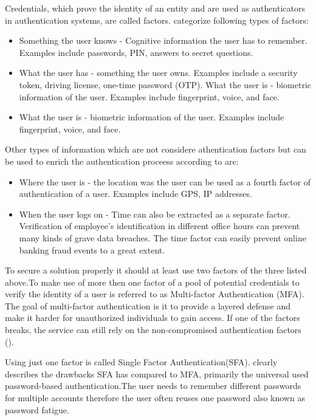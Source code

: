 Credentials, which prove the identity of an entity and are used as authenticators in authentication systems, are called factors. \citet{NIST:2017:DIG} categorize following types of factors:

\begin{itemize}  
\item Something the user knows - Cognitive information the user has to remember. Examples include passwords, PIN, answers to secret questions.
\item What the user has - something the user owns. Examples include a security token, driving license, one-time password (OTP). 
What the user is - biometric information of the user. Examples include fingerprint, voice, and face.  
\item What the user is - biometric information of the user. Examples include fingerprint, voice, and face. 
\end{itemize}

 Other types of information which are not considere athentication factors but  can be used to enrich the authentication proceess according to \citet{Dasgupta:2017:AUA} are:
 
 \begin{itemize}
 	\item Where the user is - the location was the user can be used as a fourth factor of authentication of a user. Examples include GPS, IP addresses.
 	\item When the user logs on - Time can also be extracted as a separate factor. Verification of employee’s identification in different office hours can prevent many kinds of grave data breaches. The time factor can easily prevent online banking fraud events to a great extent. 
 \end{itemize}




To secure a solution properly it should at least use two factors of the three listed above.To make use of more then one factor of a pool of potential credentials to verify the identity of a user is referred to as Multi-factor Authentication (MFA). The goal of multi-factor authentication is it to provide a layered defense and make it harder for unauthorized individuals to gain access. If one of the factors breaks, the service can still rely on the non-compromised authentication factors (\citet{Dasgupta:2017:AUA}).

Using just one factor is called Single Factor Authentication(SFA). \cite{Dasgupta:2017:AUA} clearly describes the drawbacks SFA has compared to MFA, primarily the universal used password-based authentication.The user needs to remember different passwords for multiple accounts therefore the user often reuses one password also known as password fatigue.

